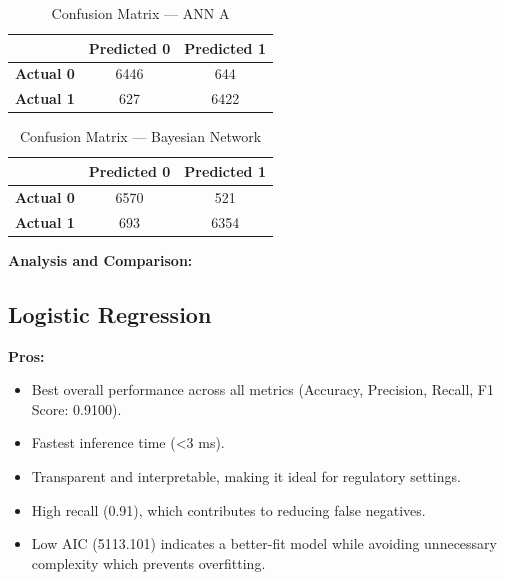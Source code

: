 \documentclass[conference]{IEEEtran}
\begin{document}
\vspace{1em}

\begin{table}[htbp]
\centering
\label{tab:conf_matrix_ann_a}
\renewcommand{\arraystretch}{1.5}
\begin{tabular}{|c|c|c|}
\hline
\textbf{} & \textbf{Predicted 0} & \textbf{Predicted 1} \\
\hline
\textbf{Actual 0} & 6446 & 644 \\
\hline
\textbf{Actual 1} & 627 & 6422 \\
\hline
\end{tabular}
\caption{Confusion Matrix — ANN A}
\end{table}

\vspace{1em}

\begin{table}[htbp]
\centering
\label{tab:conf_matrix_bn}
\renewcommand{\arraystretch}{1.5}
\begin{tabular}{|c|c|c|}
\hline
\textbf{} & \textbf{Predicted 0} & \textbf{Predicted 1} \\
\hline
\textbf{Actual 0} & 6570 & 521 \\
\hline
\textbf{Actual 1} & 693 & 6354 \\
\hline
\end{tabular}
\caption{Confusion Matrix — Bayesian Network}
\end{table}

\vspace{1em}

\noindent \textbf{Analysis and Comparison:}\\

\subsection*{Logistic Regression}

\textbf{Pros:}
\begin{itemize}
  \item Best overall performance across all metrics (Accuracy, Precision, Recall, F1 Score: 0.9100).
  \item Fastest inference time (\textless3 ms).
  \item Transparent and interpretable, making it ideal for regulatory settings.
  \item High recall (0.91), which contributes to reducing false negatives.
  \item Low AIC (5113.101) indicates a better-fit model while avoiding unnecessary complexity which prevents overfitting.
\end{itemize}
\end{document}
